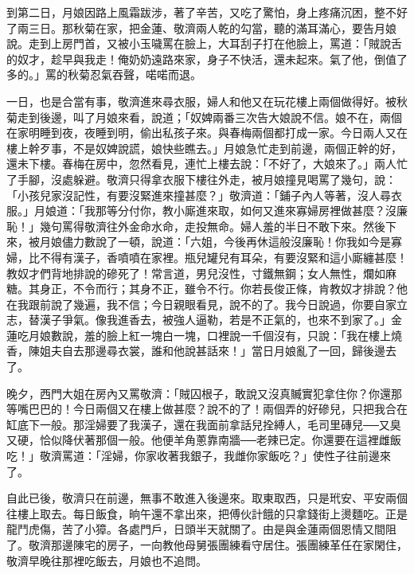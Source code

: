 到第二日，月娘因路上風霜跋涉，著了辛苦，又吃了驚怕，身上疼痛沉困，整不好了兩三日。那秋菊在家，把金蓮、敬濟兩人乾的勾當，聽的滿耳滿心，要告月娘說。走到上房門首，又被小玉噦罵在臉上，大耳刮子打在他臉上，罵道：「賊說舌的奴才，趁早與我走！俺奶奶遠路來家，身子不快活，還未起來。氣了他，倒值了多的。」罵的秋菊忍氣吞聲，喏喏而退。

一日，也是合當有事，敬濟進來尋衣服，婦人和他又在玩花樓上兩個做得好。被秋菊走到後邊，叫了月娘來看，說道；「奴婢兩番三次告大娘說不信。娘不在，兩個在家明睡到夜，夜睡到明，偷出私孩子來。與春梅兩個都打成一家。今日兩人又在樓上幹歹事，不是奴婢說謊，娘快些瞧去。」月娘急忙走到前邊，兩個正幹的好，還未下樓。春梅在房中，忽然看見，連忙上樓去說：「不好了，大娘來了。」兩人忙了手腳，沒處躲避。敬濟只得拿衣服下樓往外走，被月娘撞見喝罵了幾句，說： 「小孩兒家沒記性，有要沒緊進來撞甚麼？」敬濟道：「鋪子內人等著，沒人尋衣服。」月娘道：「我那等分付你，教小廝進來取，如何又進來寡婦房裡做甚麼？沒廉恥！」幾句罵得敬濟往外金命水命，走投無命。婦人羞的半日不敢下來。然後下來，被月娘儘力數說了一頓，說道：「六姐，今後再休這般沒廉恥！你我如今是寡婦，比不得有漢子，香噴噴在家裡。瓶兒罐兒有耳朵，有要沒緊和這小廝纏甚麼！教奴才們背地排說的磣死了！常言道，男兒沒性，寸鐵無鋼；女人無性，爛如麻糖。其身正，不令而行；其身不正，雖令不行。你若長俊正條，肯教奴才排說？他在我跟前說了幾遍，我不信；今日親眼看見，說不的了。我今日說過，你要自家立志，替漢子爭氣。像我進香去，被強人逼勒，若是不正氣的，也來不到家了。」金蓮吃月娘數說，羞的臉上紅一塊白一塊，口裡說一千個沒有，只說：「我在樓上燒香，陳姐夫自去那邊尋衣裳，誰和他說甚話來！」當日月娘亂了一回，歸後邊去了。

晚夕，西門大姐在房內又罵敬濟：「賊囚根子，敢說又沒真贓實犯拿住你？你還那等嘴巴巴的！今日兩個又在樓上做甚麼？說不的了！兩個弄的好磣兒，只把我合在缸底下一般。那淫婦要了我漢子，還在我面前拿話兒拴縛人，毛司里磚兒──又臭又硬，恰似降伏著那個一般。他便羊角蔥靠南牆──老辣已定。你還要在這裡雌飯吃！」敬濟罵道：「淫婦，你家收著我銀子，我雌你家飯吃？」使性子往前邊來了。

自此已後，敬濟只在前邊，無事不敢進入後邊來。取東取西，只是玳安、平安兩個往樓上取去。每日飯食，晌午還不拿出來，把傅伙計餓的只拿錢街上燙麵吃。正是龍鬥虎傷，苦了小獐。各處門戶，日頭半天就關了。由是與金蓮兩個恩情又間阻了。敬濟那邊陳宅的房子，一向教他母舅張團練看守居住。張團練革任在家閑住，敬濟早晚往那裡吃飯去，月娘也不追問。

